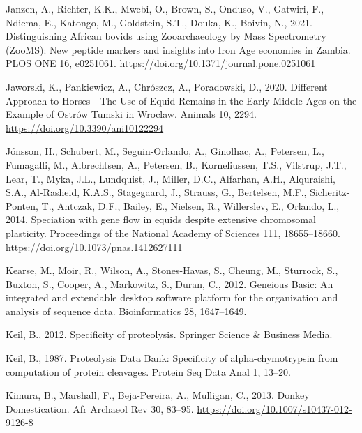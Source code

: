 \documentclass[preprint, 3p, authoryear]{elsarticle} %
\newlength{\cslhangindent}
\newlength{\cslentryspacingunit} %
\newenvironment{CSLReferences}[2] %
 {%
  \setlength{\parindent}{0pt}
  \ifodd #1
  \let\oldpar\par
  \def\par{\hangindent=\cslhangindent\oldpar}
  \fi
  \setlength{\parskip}{#2\cslentryspacingunit}
 }%
 {}
\begin{document}
\begin{CSLReferences}{1}{0}
\leavevmode{}%
Janzen, A., Richter, K.K., Mwebi, O., Brown, S., Onduso, V., Gatwiri, F., Ndiema, E., Katongo, M., Goldstein, S.T., Douka, K., Boivin, N., 2021. Distinguishing {African} bovids using {Zooarchaeology} by {Mass Spectrometry} ({ZooMS}): {New} peptide markers and insights into {Iron Age} economies in {Zambia}. PLOS ONE 16, e0251061. \url{https://doi.org/10.1371/journal.pone.0251061}

\leavevmode{}%
Jaworski, K., Pankiewicz, A., Chrószcz, A., Poradowski, D., 2020. Different {Approach} to {Horses}---{The Use} of {Equid Remains} in the {Early Middle Ages} on the {Example} of {Ostrów Tumski} in {Wroclaw}. Animals 10, 2294. \url{https://doi.org/10.3390/ani10122294}

\leavevmode{}%
Jónsson, H., Schubert, M., Seguin-Orlando, A., Ginolhac, A., Petersen, L., Fumagalli, M., Albrechtsen, A., Petersen, B., Korneliussen, T.S., Vilstrup, J.T., Lear, T., Myka, J.L., Lundquist, J., Miller, D.C., Alfarhan, A.H., Alquraishi, S.A., Al-Rasheid, K.A.S., Stagegaard, J., Strauss, G., Bertelsen, M.F., Sicheritz-Ponten, T., Antczak, D.F., Bailey, E., Nielsen, R., Willerslev, E., Orlando, L., 2014. Speciation with gene flow in equids despite extensive chromosomal plasticity. Proceedings of the National Academy of Sciences 111, 18655--18660. \url{https://doi.org/10.1073/pnas.1412627111}

\leavevmode{}%
Kearse, M., Moir, R., Wilson, A., Stones-Havas, S., Cheung, M., Sturrock, S., Buxton, S., Cooper, A., Markowitz, S., Duran, C., 2012. Geneious {Basic}: An integrated and extendable desktop software platform for the organization and analysis of sequence data. Bioinformatics 28, 1647--1649.

\leavevmode{}%
Keil, B., 2012. Specificity of proteolysis. {Springer Science \& Business Media}.

\leavevmode{}%
Keil, B., 1987. \href{https://www.ncbi.nlm.nih.gov/pubmed/3447153}{Proteolysis {Data Bank}: Specificity of alpha-chymotrypsin from computation of protein cleavages}. Protein Seq Data Anal 1, 13--20.

\leavevmode{}%
Kimura, B., Marshall, F., Beja-Pereira, A., Mulligan, C., 2013. Donkey {Domestication}. Afr Archaeol Rev 30, 83--95. \url{https://doi.org/10.1007/s10437-012-9126-8}


\end{CSLReferences}
\end{document}
